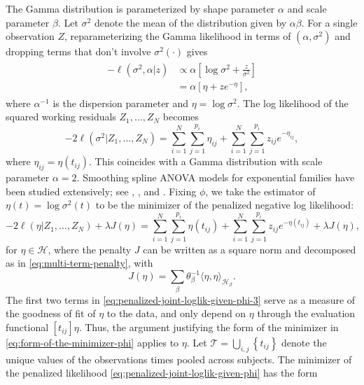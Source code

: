 \documentclass[12pt]{article}
\newcommand{\hilbert}{\mathcal{H}}
\begin{document}
The Gamma distribution is parameterized by shape parameter $\alpha$ and scale parameter $\beta$. Let $\sigma^2$ denote the mean of the distribution given by $\alpha \beta$. For a single observation $Z$, reparameterizing the Gamma likelihood in terms of $\left(\alpha, \sigma^2 \right)$ and dropping terms that don't involve $\sigma^2\left(\cdot\right)$ gives  
\begin{align}
\begin{split}
-\ell \left(\sigma^2, \alpha \vert z \right) &\propto \alpha\left[\log \sigma^2 +\frac{z}{\sigma^2} \right]  \\ 
&= \alpha\left[\eta + ze^{-\eta}\right],\label{eq:gamma-iv-likelihood-canonical-link}
\end{split}
\end{align}
\noindent
where $\alpha^{-1}$ is the dispersion parameter and $\eta = \log \sigma^2$. The log likelihood of the squared working residuals $Z_1,\dots, Z_N$ becomes 
\begin{equation} \label{eq:penalized-joint-loglik-given-phi-3}
-2\ell\left(  \sigma^2 \vert Z_1,\dots, Z_N \right) =  \sum_{i = 1}^N \sum_{j = 1}^{p_i} \eta_{ij}  + \sum_{i = 1}^N \sum_{j = 1}^{p_i} z_{ij}e^{-\eta_{ij}},
\end{equation}
\noindent
where $\eta_{ij} = \eta\left(t_{ij}\right)$. This coincides with a Gamma distribution with scale parameter $\alpha = 2$. Smoothing spline ANOVA models for exponential families have been studied extensively; see \cite{wahba1995smoothing}, \cite{wang1997grkpack}, and \cite{gu2013smoothing}. Fixing $\phi$, we take the estimator of $\eta\left(t\right) = \log\sigma^2\left(t\right)$ to be the minimizer of the penalized negative log likelihood:
\begin{equation} \label{eq:penalized-joint-loglik-given-phi}
-2\ell\left( \eta \vert Z_1,\dots, Z_N \right) +\lambda J \left(\eta\right) =  \sum_{i = 1}^N \sum_{j = 1}^{p_i} \eta\left(t_{ij}\right)  + \sum_{i = 1}^N \sum_{j = 1}^{p_i} z_{ij} e^{-\eta\left(t_{ij}\right)} + \lambda J\left(\eta\right),  
\end{equation}
\noindent
for $\eta \in \hilbert$, where the penalty $J$ can be written as a square norm and decomposed as in \eqref{eq:multi-term-penalty}, with
\begin{equation*} 
J\left(\eta \right) = \sum_{\beta} \theta_\beta^{-1}\langle \eta,\eta \rangle_{\hilbert_\beta}.
\end{equation*}
\noindent 
The first two terms in \eqref{eq:penalized-joint-loglik-given-phi-3} serve as a measure of the goodness of fit of $\eta$ to the data, and only depend on $\eta$ through the evaluation functional $\left[t_{ij}\right]\eta$. Thus, the argument justifying the form of the minimizer in \eqref{eq:form-of-the-minimizer-phi} applies to $\eta$. Let $\mathcal{T} = \bigcup_{i,j} \left\{t_{ij}\right\}$ denote the unique values of the observations times pooled across subjects. The minimizer of the penalized likelihood \eqref{eq:penalized-joint-loglik-given-phi} has the form 
\end{document}
